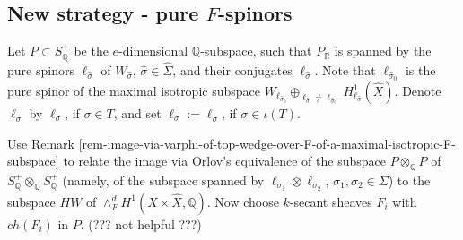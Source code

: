 \documentclass[12pt]{amsart}
\numberwithin{equation}{subsection}
\theoremstyle{plain}
\theoremstyle{definition}
\newcommand{\QQ}{{\mathbb Q}}
\newcommand{\RR}{{\mathbb R}}
\newcommand{\PP}{{\mathbb P}}
\renewcommand{\span}{{\rm span}}
\begin{document}
{{\subsection{New strategy - pure $F$-spinors}
Let $P\subset S^+_\QQ$ be the $e$-dimensional $\QQ$-subspace, such that $P_\RR$ is spanned by the pure spinors $\ell_{\hat{\sigma}}$ of 
$W_{\hat{\sigma}}$, $\hat{\sigma}\in\hat{\Sigma}$, and their conjugates $\bar{\ell}_{\hat{\sigma}}$. Note that $\ell_{\hat{\sigma}_0}$ is the pure spinor of the maximal isotropic subspace $W_{\ell_{\hat{\sigma}_0}}\oplus_{\ell_{\hat{\sigma}}\neq \ell_{\hat{\sigma}_0}}H^1_{\ell_{\hat{\sigma}}}(\hat{X})$.
Denote $\ell_{\hat{\sigma}}$ by $\ell_\sigma$, if $\sigma\in T$, and set $\ell_\sigma:=\bar{\ell}_{\hat{\sigma}}$, if $\sigma\in \iota(T)$.

Use Remark \ref{rem-image-via-varphi-of-top-wedge-over-F-of-a-maximal-isotropic-F-subspace} to relate the image via Orlov's equivalence of the subspace $P\otimes_\QQ P$ of $S^+_\QQ \otimes_\QQ S^+_\QQ$ (namely, of the subspace spanned by $\ell_{\sigma_1}\otimes\ell_{\sigma_2}$, $\sigma_1,\sigma_2\in\Sigma$) to 
the subspace $HW$ of $\wedge^d_FH^1(X\times\hat{X},\QQ)$. Now choose $k$-secant sheaves $F_i$ with $ch(F_i)$ in $P$.
(??? not helpful ???)

}

% 
}
\end{document}
